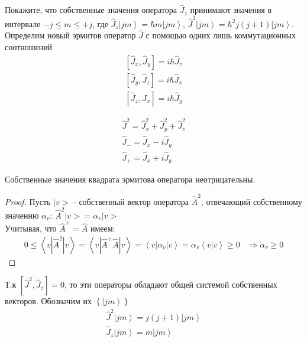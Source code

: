 \documentclass[__main__.tex]{subfiles}
\begin{document}
Покажите, что собственные значения оператора $\hat{J}_z$ принимают значения в интервале $-j\le m\le +j$, где $\hat{J}_z\left|jm\right>=\hbar m\left|jm\right>$, $\hat{J}^2\left|jm\right>=\hbar^2 j(j+1)\left|jm\right>$.\\

Определим новый эрмитов оператор $\hat{J}$ с помощью одних лишь коммутационных соотношений
\begin{gather*}
    \left[\hat{J}_x,\hat{J}_y\right] = i\hbar\hat{J}_z\\
    \left[\hat{J}_y,\hat{J}_z\right] = i\hbar\hat{J}_x\\
    \left[\hat{J}_z,\hat{J}_x\right] = i\hbar\hat{J}_y
\end{gather*}

\begin{gather*}
    \hat{J}^2 = \hat{J}^2_x+\hat{J}^2_y+\hat{J}^2_z\\
    \hat{J}_{-} = \hat{J}_x-i\hat{J}_y\\
    \hat{J}_{+} = \hat{J}_x+i\hat{J}_y
\end{gather*}

\begin{theorem}
    Собственные значения квадрата эрмитова оператора неотрицательны.
\end{theorem}
\begin{proof}
    Пусть $|v>$ - собственный вектор оператора $\hat{A}^2$, отвечающий собственному значению $\alpha_v$: $\hat{A}^2|v> = \alpha_v|v>$\\
    Учитывая, что $\hat{A}^{+} = \hat{A}$ имеем:
    \begin{gather*}
        0 \leq \left<v|\hat{A}^2|v\right> = \left<v|\hat{A}^{+}\hat{A}|v\right> = \left<v|\alpha_v|v\right> = \alpha_v\left<v|v\right> \geq 0\;\;\;\Rightarrow \alpha_v \geq 0
    \end{gather*}
\end{proof}
Т.к $\left[\hat{J}^2,\hat{J}_z\right] = 0$, то эти операторы обладают общей системой собственных векторов. Обозначим их $\left\{\left|jm\right>\right\}$
\begin{gather*}
    \hat{J}^2\left|jm\right> = j(j+1)\left|jm\right>\\
    \hat{J}_z\left|jm\right> = m\left|jm\right>
\end{gather*}
\end{document}
